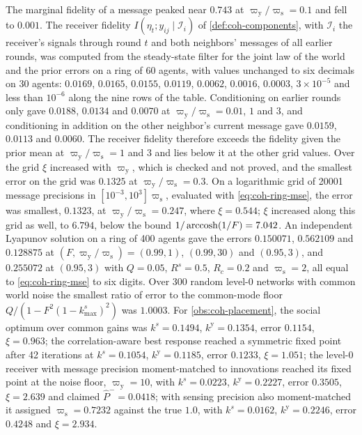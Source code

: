 \begin{numcheck}
The marginal fidelity of a message peaked near $0.743$ at $\varpi_{\mathrm y}/\varpi_{\mathrm s}=0.1$ and fell to $0.001$. The receiver fidelity $I(\eta_t;y_{ij}\mid\mathcal I_i)$ of \cref{def:coh-components}, with $\mathcal I_i$ the receiver's signals through round $t$ and both neighbors' messages of all earlier rounds, was computed from the steady-state filter for the joint law of the world and the prior errors on a ring of 60 agents, with values unchanged to six decimals on 30 agents: $0.0169$, $0.0165$, $0.0155$, $0.0119$, $0.0062$, $0.0016$, $0.0003$, $3\times10^{-5}$ and less than $10^{-6}$ along the nine rows of the table. Conditioning on earlier rounds only gave $0.0188$, $0.0134$ and $0.0070$ at $\varpi_{\mathrm y}/\varpi_{\mathrm s}=0.01$, $1$ and $3$, and conditioning in addition on the other neighbor's current message gave $0.0159$, $0.0113$ and $0.0060$. The receiver fidelity therefore exceeds the fidelity given the prior mean at $\varpi_{\mathrm y}/\varpi_{\mathrm s}=1$ and $3$ and lies below it at the other grid values. Over the grid $\xi$ increased with $\varpi_{\mathrm y}$, which is checked and not proved, and the smallest error on the grid was $0.1325$ at $\varpi_{\mathrm y}/\varpi_{\mathrm s}=0.3$. On a logarithmic grid of 20001 message precisions in $[10^{-3},10^3]\varpi_{\mathrm s}$, evaluated with \eqref{eq:coh-ring-mse}, the error was smallest, $0.1323$, at $\varpi_{\mathrm y}/\varpi_{\mathrm s}=0.247$, where $\xi=0.544$; $\xi$ increased along this grid as well, to $6.794$, below the bound $1/\operatorname{arccosh}(1/F)=7.042$. An independent Lyapunov solution on a ring of 400 agents gave the errors $0.150071$, $0.562109$ and $0.128875$ at $(F,\varpi_{\mathrm y}/\varpi_{\mathrm s})=(0.99,1)$, $(0.99,30)$ and $(0.95,3)$, and $0.255072$ at $(0.95,3)$ with $Q=0.05$, $R^s=0.5$, $R_c=0.2$ and $\varpi_{\mathrm s}=2$, all equal to \eqref{eq:coh-ring-mse} to six digits. Over 300 random level-0 networks with common world noise the smallest ratio of error to the common-mode floor $Q/(1-F^2(1-k^s_{\max})^2)$ was $1.0003$. For \cref{obs:coh-placement}, the social optimum over common gains was $k^s=0.1494$, $k^{\mathrm y}=0.1354$, error $0.1154$, $\xi=0.963$; the correlation-aware best response reached a symmetric fixed point after 42 iterations at $k^s=0.1054$, $k^{\mathrm y}=0.1185$, error $0.1233$, $\xi=1.051$; the level-0 receiver with message precision moment-matched to innovations reached its fixed point at the noise floor, $\varpi_{\mathrm y}=10$, with $k^s=0.0223$, $k^{\mathrm y}=0.2227$, error $0.3505$, $\xi=2.639$ and claimed $\hat P^-=0.0418$; with sensing precision also moment-matched it assigned $\varpi_{\mathrm s}=0.7232$ against the true $1.0$, with $k^s=0.0162$, $k^{\mathrm y}=0.2246$, error $0.4248$ and $\xi=2.934$.
\end{numcheck}
